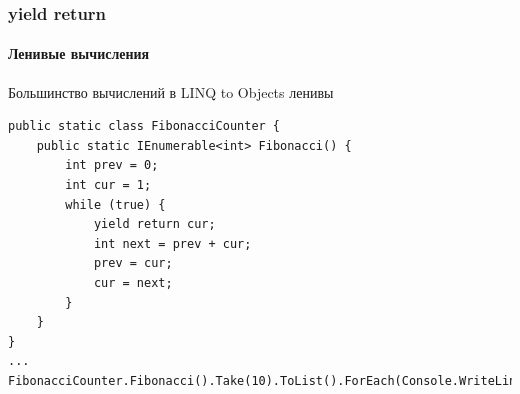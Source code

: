 \documentclass[xetex,mathserif,serif]{beamer}
\begin{document}
	\begin{frame}[fragile]
		\frametitle{yield return}
		\framesubtitle{Ленивые вычисления}
		Большинство вычислений в LINQ to Objects ленивы
		\begin{footnotesize}
			\begin{verbatim}
public static class FibonacciCounter {
    public static IEnumerable<int> Fibonacci() {
        int prev = 0;
        int cur = 1;
        while (true) {
            yield return cur;
            int next = prev + cur;
            prev = cur;
            cur = next;
        }
    }
}
...
FibonacciCounter.Fibonacci().Take(10).ToList().ForEach(Console.WriteLine);
			\end{verbatim}
		\end{footnotesize}
	\end{frame}
\end{document}
